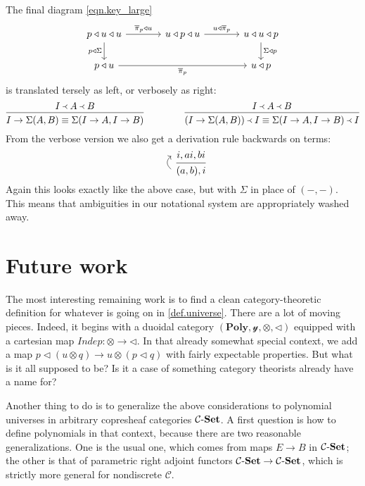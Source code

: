 \documentclass[11pt, one side, article]{memoir}
\newcommand{\upp}{\begin{tikzcd}[row sep=6pt]~\\~\ar[u, bend left=50pt, looseness=1.3, start anchor=east, end anchor=east]\end{tikzcd}}
\theoremstyle{definition}
\theoremstyle{plain}
\newcommand{\cat}[1]{\mathcal{#1}}%
\newcommand{\Cat}[1]{\mathbf{#1}}%
\newcommand{\Fun}[1]{\mathit{#1}}%
\newcommand{\tn}[1]{\textnormal{#1}}
\newcommand{\ol}[1]{\overline{#1}}
\newcommand{\set}{\tn{-}\Cat{Set}}
\newcommand{\yon}{\mathcal{y}}
\newcommand{\poly}{\Cat{Poly}}
\newcommand{\0}{\textsf{0}}
\newcommand{\1}{\tn{\textsf{1}}}
\newcommand{\tri}{\mathbin{\triangleleft}}
\newcommand{\indep}{\Fun{Indep}}
\newcommand{\jump}{\pi}
\newcommand{\founds}{\Yleft}
\begin{document}
The final diagram \eqref{eqn.key_large}
\[
\begin{tikzcd}[ampersand replacement=\&, column sep=large]
  p\tri u\tri u\ar[d, "p\tri\Sigma"']\ar[r, "\ol\jump_p\tri u"]\&
  u\tri p\tri u\ar[r, "u\tri\ol\jump_p"]\&
  u\tri u\tri p\ar[d, "\Sigma\tri p"]\\
  p\tri u\ar[rr, "\ol\jump_p"']\&\&
  u\tri p
\end{tikzcd}
\]
is translated tersely as left, or verbosely as right:
\[
  \begin{prooftree}
    \Hypo{I\founds A\founds B}
    \Infer1{I\to\Sigma(A,B)\equiv\Sigma(I\to A,I\to B)}
  \end{prooftree}
  \hspace{.6in}
  \begin{prooftree}
    \Hypo{I\founds A\founds B}
    \Infer1{(I\to\Sigma(A,B))\founds I\equiv\Sigma(I\to A,I\to B)\founds I}
  \end{prooftree}  
\]
From the verbose version we also get a derivation rule backwards on terms:
\[
  \begin{prooftree}
    \Hypo{i,ai,bi}
    \Infer[left label={$\upp$}]1{(a,b),i}
  \end{prooftree}
\]
Again this looks exactly like the above case, but with $\Sigma$ in place of $(-,-)$. This means that ambiguities in our notational system are appropriately washed away.

\chapter{Future work}

The most interesting remaining work is to find a clean category-theoretic definition for whatever is going on in \cref{def.universe}. There are a lot of moving pieces. Indeed, it begins with a duoidal category $(\poly,\yon,\otimes,\tri)$ equipped with a cartesian map $\indep\colon\otimes\to\tri$. In that already somewhat special context, we add a map $p\tri (u\otimes q)\to u\otimes (p\tri q)$ with fairly expectable properties. But what is it all supposed to be? Is it a case of something category theorists already have a name for?

Another thing to do is to generalize the above considerations to polynomial universes in arbitrary copresheaf categories $\cat{C}\set$. A first question is how to define polynomials in that context, because there are two reasonable generalizations. One is the usual one, which comes from maps $E\to B$ in $\cat{C}\set$; the other is that of parametric right adjoint functors $\cat{C}\set\to\cat{C}\set$, which is strictly more general for nondiscrete $\cat{C}$. 
\end{document}
